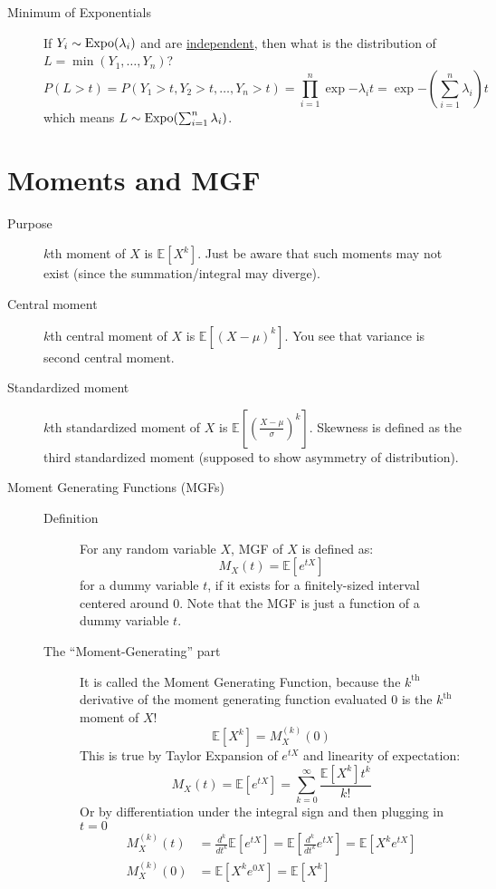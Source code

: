 \documentclass[11pt]{article}
\theoremstyle{definition}
\theoremstyle{remark}
\newcommand{\E}[1]{\mathbb{E}\left[ #1 \right]}
\newcommand{\Expo}{\textnormal{Expo}}
\begin{document}
\begin{description}
\begin{description}
    \item [Minimum of Exponentials] If $Y_i \sim \Expo(\lambda_i)$ and are \underline{independent}, then what is the distribution of $L = \min(Y_1, \ldots, Y_n)$? $$ P(L > t) = P( Y_1 > t, Y_2 > t, \ldots, Y_n> t) = \prod_{i=1}^n \exp{-\lambda_i t} = \exp{- \left(\sum_{i=1}^n \lambda_i\right) t} $$ which means $L \sim \Expo(\sum_{i=1}^n \lambda_i)$. 
    
\end{description}
\end{description}

\section{Moments and MGF}
\begin{description}
\item[Purpose] $k$th moment of $X$ is $\E{X^k}$. Just be aware that such moments may not exist (since the summation/integral may diverge). 

\item[Central moment] $k$th central moment of $X$ is $\E{(X-\mu)^k}$. You see that variance is second central moment. 

\item[Standardized moment] $k$th standardized moment of $X$ is $\E{(\frac{X-\mu}{\sigma})^k}$. Skewness is defined as the third standardized moment (supposed to show asymmetry of distribution).

\item[Moment Generating Functions (MGFs)]

    \begin{description}
    \item [Definition] For any random variable $X$, MGF of $X$ is defined as: $$ M_X(t) = \E{e^{tX}} $$ for a dummy variable $t$, if it exists for a finitely-sized interval centered around 0. Note that the MGF is just a function of a dummy variable $t$.
    
    \item [The ``Moment-Generating'' part] It is called the Moment Generating Function, because the $k^{\text{th}}$ derivative of the moment generating function evaluated 0 is the $k^{\text{th}}$ moment of $X$! $$\E{X^k} = M_X^{(k)}(0)$$ This is true by Taylor Expansion of $e^{tX}$ and linearity of expectation:
	$$M_X(t) = \E{e^{tX}} = \sum_{k=0}^\infty \frac{\E{X^k}t^k}{k!} $$
	Or by differentiation under the integral sign and then plugging in $t=0$
	\begin{align*}
		M_X^{(k)}(t) &= \frac{d^k}{dt^k}\E{e^{tX}} = \E{\frac{d^k}{dt^k}e^{tX}} = \E{X^ke^{tX}} \\
		M_X^{(k)}(0) &= \E{X^ke^{0X}} = \E{X^k}
	\end{align*}
	

\end{description}
\end{description}
\end{document}
